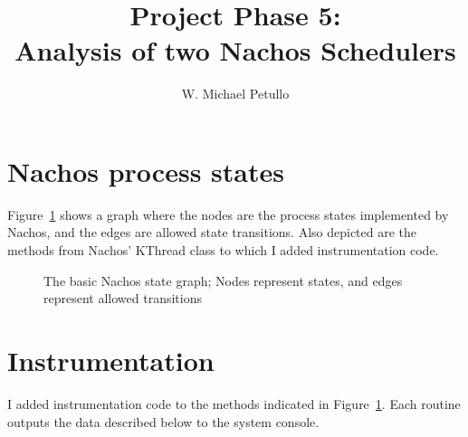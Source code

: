 \documentclass{article}
\title{Project Phase 5: \\ Analysis of two Nachos Schedulers}
\author{W. Michael Petullo}
\newcommand{\command}[1]{{\sffamily#1}}
\begin{document}
\maketitle

\section{Nachos process states}
Figure~\ref{fig:states} shows a graph where the nodes are the process
states implemented by Nachos, and the edges are allowed state transitions.
Also depicted are the methods from Nachos' \command{KThread} class
to which I added instrumentation code. 

\begin{figure}[h]
\centering
\begin{tikzpicture}

\end{tikzpicture}
\caption{The basic Nachos state graph; Nodes represent states, and edges represent allowed transitions}
\label{fig:states}
\end{figure}

\section{Instrumentation}
I added instrumentation code to the methods indicated in Figure~\ref{fig:states}.
Each routine outputs the data described below to the system console.
\end{document}
